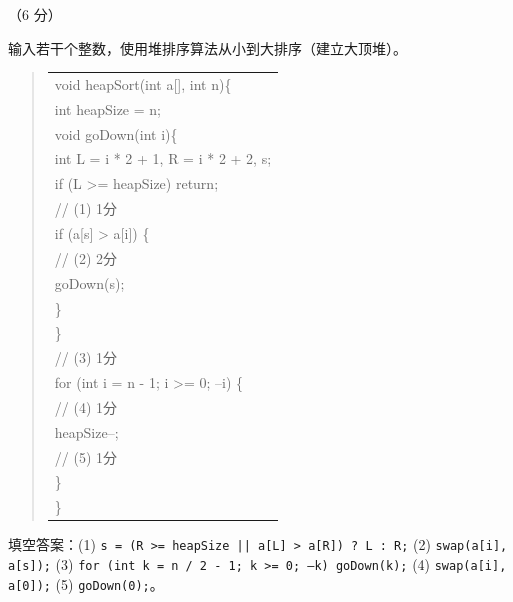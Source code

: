 \begin{question}[堆排序]（6 分）

输入若干个整数，使用堆排序算法从小到大排序（建立大顶堆）。

\begin{quote}
\footnotesize
\begin{tabular}{@{}l@{}}
void heapSort(int a[], int n)\{\\
    int heapSize = n;\\
    void goDown(int i)\{\\
        int L = i * 2 + 1, R = i * 2 + 2, s;\\
        if (L >= heapSize) return;\\
\underline{\hspace{12em}} // (1) 1分\\
        if (a[s] > a[i]) \{\\
\underline{\hspace{12em}} // (2) 2分\\
            goDown(s);\\
        \}\\
    \}\\
\underline{\hspace{12em}} // (3) 1分\\
    for (int i = n - 1; i >= 0; --i) \{\\
\underline{\hspace{12em}} // (4) 1分\\
        heapSize--;\\
\underline{\hspace{12em}} // (5) 1分\\
    \}\\
\}\end{tabular}
\end{quote}

\begin{solution}
填空答案：(1) \texttt{s = (R >= heapSize || a[L] > a[R]) ? L : R;} (2) \texttt{swap(a[i], a[s]);} (3) \texttt{for (int k = n / 2 - 1; k >= 0; --k) goDown(k);} (4) \texttt{swap(a[i], a[0]);} (5) \texttt{goDown(0);}。
\end{solution}
\end{question}

\clearpage
